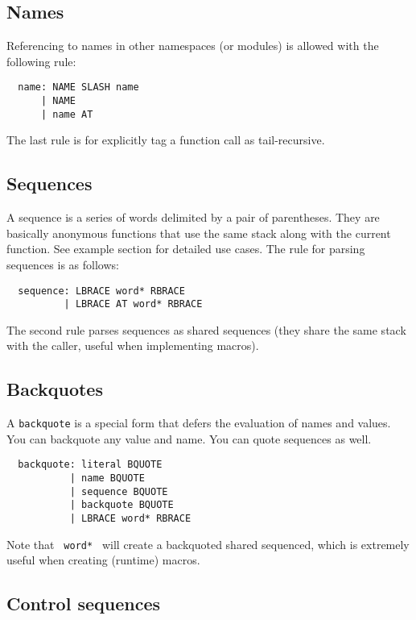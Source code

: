 \documentclass{article}
\begin{document}
\subsection{Names}

Referencing to names in other namespaces (or modules) is allowed with the following rule:
\begin{verbatim}
  name: NAME SLASH name
      | NAME
      | name AT
\end{verbatim}

The last rule is for explicitly tag a function call as tail-recursive.

\subsection{Sequences}

A sequence is a series of words delimited by a pair of parentheses. They are basically anonymous functions that use the same stack along with the current function. See example section for detailed use cases. The rule for parsing sequences is as follows:
\begin{verbatim}
  sequence: LBRACE word* RBRACE
          | LBRACE AT word* RBRACE
\end{verbatim}

The second rule parses sequences as shared sequences (they share the same stack with the caller, useful when implementing macros).

\subsection{Backquotes}

A \texttt{backquote} is a special form that defers the evaluation of names and values. You can backquote any value and name. You can quote sequences as well.
\begin{verbatim}
  backquote: literal BQUOTE
           | name BQUOTE
           | sequence BQUOTE
           | backquote BQUOTE
           | LBRACE word* RBRACE
\end{verbatim}

Note that \texttt{{ word* }} will create a backquoted shared sequenced, which is extremely useful when creating (runtime) macros.

\subsection{Control sequences}
\end{document}
